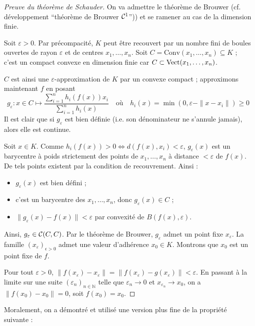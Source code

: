 \documentclass[a4paper, 11pt]{article}
\def\N{\mathbb{N}}
\def\Cf{{\cal{C}}}
\def\Vect{\textnormal{Vect}}
\begin{document}
\begin{proof}[Preuve du théorème de Schauder]
  On va admettre le théorème de Brouwer (cf. développement \enquote{théorème de
    Brouwer $\Cf^1$})) et se ramener au cas de la dimension finie.

  Soit $\varepsilon > 0$. Par précompacité, $K$ peut être recouvert par un
  nombre fini de boules ouvertes de rayon $\varepsilon$ et de centres $x_1,
  \ldots, x_n$. Soit $C = \mathrm{Conv}(x_1, \ldots, x_n) \subseteq K$ ; c'est
  un compact convexe en dimension finie car $C \subset \Vect(x_1,\ldots,x_n)$.
  
  $C$ est ainsi une $\varepsilon$-approximation de $K$ par un convexe compact ;
  approximons maintenant $f$ en posant
  \[g_\varepsilon : x \in C \mapsto
    \frac{\sum_{i=1}^n h_i(f(x))x_i}{\sum_{i=1}^n h_i(x)}
    \quad \text{où} \quad
    h_i(x) = \min(0, \varepsilon - \|x-x_i\|) \geq 0
  \]
  Il est clair que si $g_\varepsilon$ est bien définie (i.e. son dénominateur ne
  s'annule jamais), alors elle est continue.
  
  Soit $x \in K$. Comme $h_i(f(x)) > 0 \Leftrightarrow d(f(x),x_i) <
  \varepsilon$, $g_\varepsilon(x)$ est un barycentre à poids strictement des
  points de $x_1, \ldots, x_n$ à distance $< \varepsilon$ de $f(x)$. De tels
  points existent par la condition de recouvrement. Ainsi :
  \begin{itemize}
  \item $g_\varepsilon(x)$ est bien défini ;
  \item c'est un barycentre des $x_1, \ldots, x_n$, donc $g_\varepsilon(x) \in
    C$ ; 
  \item $\|g_\varepsilon(x) - f(x)\| < \varepsilon$ par convexité de $B(f(x),
    \varepsilon)$.
  \end{itemize}
  Ainsi, $g_\varepsilon \in \Cf(C,C)$. Par le théorème de Brouwer,
  $g_\varepsilon$ admet un point fixe $x_\varepsilon$. La famille
  $(x_\varepsilon)_{\epsilon > 0}$ admet une valeur d'adhérence $x_0 \in K$.
  Montrons que $x_0$ est un point fixe de $f$.

  Pour tout $\varepsilon > 0$, $\|f(x_\varepsilon) - x_\varepsilon\| =
  \|f(x_\varepsilon) - g(x_\varepsilon)\| < \varepsilon$.
  En passant à la limite sur une suite $(\varepsilon_n)_{n \in \N}$ telle que
  $\varepsilon_n \to 0$ et $x_{\varepsilon_n} \to x_0$, on a $\|f(x_0) - x_0\| =
  0$, soit $f(x_0) = x_0$.
\end{proof}

Moralement, on a démontré et utilisé une version plus fine de la propriété
suivante :
\end{document}
